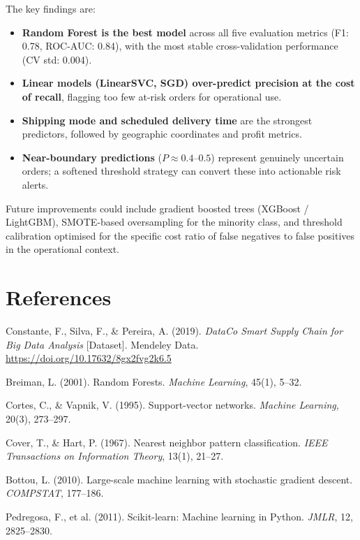 \documentclass[12pt,a4paper]{article}
\begin{document}
The key findings are:

\begin{itemize}[itemsep=3pt]
  \item \textbf{Random Forest is the best model} across all five evaluation
        metrics (F1: 0.78, ROC-AUC: 0.84), with the most stable
        cross-validation performance (CV std: 0.004).
  \item \textbf{Linear models (LinearSVC, SGD) over-predict precision at the
        cost of recall}, flagging too few at-risk orders for operational use.
  \item \textbf{Shipping mode and scheduled delivery time} are the strongest
        predictors, followed by geographic coordinates and profit metrics.
  \item \textbf{Near-boundary predictions} ($P \approx 0.4$--$0.5$) represent
        genuinely uncertain orders; a softened threshold strategy can convert
        these into actionable risk alerts.
\end{itemize}

Future improvements could include gradient boosted trees (XGBoost / LightGBM),
SMOTE-based oversampling for the minority class, and threshold calibration
optimised for the specific cost ratio of false negatives to false positives in
the operational context.

\section*{References}

\begin{enumerate}[label={[\arabic*]},leftmargin=2.5em,itemsep=4pt]
  \item Constante, F., Silva, F., \& Pereira, A. (2019).
        \textit{DataCo Smart Supply Chain for Big Data Analysis} [Dataset].
        Mendeley Data. \url{https://doi.org/10.17632/8gx2fvg2k6.5}
  \item Breiman, L. (2001). Random Forests.
        \textit{Machine Learning}, 45(1), 5--32.
  \item Cortes, C., \& Vapnik, V. (1995). Support-vector networks.
        \textit{Machine Learning}, 20(3), 273--297.
  \item Cover, T., \& Hart, P. (1967). Nearest neighbor pattern classification.
        \textit{IEEE Transactions on Information Theory}, 13(1), 21--27.
  \item Bottou, L. (2010). Large-scale machine learning with stochastic
        gradient descent. \textit{COMPSTAT}, 177--186.
  \item Pedregosa, F., et al. (2011). Scikit-learn: Machine learning in Python.
        \textit{JMLR}, 12, 2825--2830.
\end{enumerate}
\end{document}
